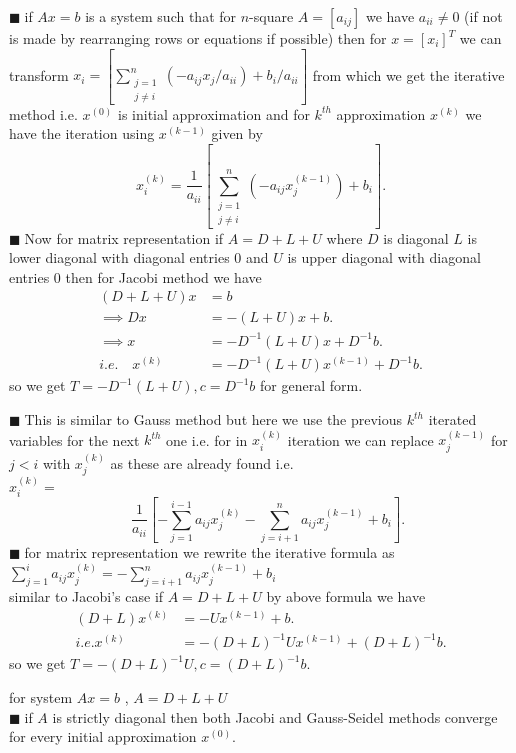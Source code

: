 \documentclass[11pt]{extarticle}
\newcommand{\sm}[2]{\displaystyle\sum_{#1}^{#2}}
\newcommand{\snote}[1]{{\footnotesize(#1)}}
\newcommand{\tbx}[2][]{
\begin{tcolorbox}[enhanced,breakable,size=small,colback=black!2!white,title={#1},arc is angular, arc=1.5mm,drop fuzzy shadow]
	#2
\end{tcolorbox}
}
\newcommand{\y}{$\blacksquare\;$}
\begin{document}
\begin{multicols}{2}
				\tbx[Jacobi's Method]{\y if $ Ax=b $ is a system such that for $ n $-square $ A=[a_{ij}] $ we have $ a_{ii}\neq 0 $ \snote{if not is made by rearranging rows or equations if possible} then for $ x=[x_i]^T $ we can transform $ x_i=  \left[\sm{\substack{j=1 \\  j\neq i}}{n}(-a_{ij}x_j/a_{ii}) +b_i/a_{ii}\right]$ from which we get the iterative method i.e. $ x^{(0)} $ is initial approximation and for $ k^{th} $ approximation $ x^{(k)} $ we have the iteration using $ x^{(k-1)} $ given by
				\[ x_i^{(k)}=\frac{ 1 }{a_{ii}} \left[\sm{\substack{j=1 \\ j\neq i}}{n}(-a_{ij}x_j^{(k-1)}) +b_i\right].\]
				 \y Now for matrix representation if $ A=D+L+U $ where $ D $ is diagonal $ L $ is lower diagonal with diagonal entries $ 0 $ and $ U $ is upper diagonal with diagonal entries $ 0 $ then for Jacobi method we have 
				 \begin{align*}
				 	(D+L+U)x&=b\\
				 	\implies Dx&= -(L+U)x+b.\\
				 	\implies x&=-D^{-1}(L+U)x+D^{-1}b.\\
				 	i.e. \quad x^{(k)}&=-D^{-1}(L+U)x^{(k-1)}+D^{-1}b.
				 	\end{align*}  
			 	so we get $ T=-D^{-1}(L+U),c=D^{-1}b $ for general form.}
				 \tbx[Gauss-Seidel Method]{ \y This is similar to Gauss method but here we use the previous $ k^{th} $ iterated variables for the next $ k^{th} $ one  i.e. for in $ x_i^{(k)} $ iteration we can replace $ x_j^{(k-1)} $ for $ j<i $ with $ x_j^{(k)} $ as these are already found i.e.\\
				 	 $x_i^{(k)}=$
				 \[\quad \frac{ 1 }{a_{ii}} \left[-\sm{j=1}{i-1}a_{ij}x_j^{(k)}-\sm{j=i+1}{n}a_{ij}x_j^{(k-1)}+b_i\right].\] 
				 \y for matrix representation we rewrite the iterative formula as \\
				 $\sm{j=1}{i}a_{ij}x_j^{(k)}=-\sm{j=i+1}{n}a_{ij}x_j^{(k-1)}+b_i$\\
				 similar to Jacobi's case if $ A=D+L+U $ by above formula we have 
				{ \small
					\begin{align*}
				 	(D+L)x^{(k)}&=-Ux^{(k-1)}+b.\\
				 	i.e. x^{(k)}&= -(D+L)^{-1}Ux^{(k-1)}+(D+L)^{-1}b.
				 	\end{align*}}
			 	so we get $ T=-(D+L)^{-1}U,c=(D+L)^{-1}b. $ }
			 	\tbx{ for system $ Ax=b $ , $ A=D+L+U $ \\
			 		\y if $  A$ is strictly diagonal then both Jacobi and Gauss-Seidel methods converge for every initial approximation $ x^{(0)}. $ \\
}
\end{multicols}
\end{document}
